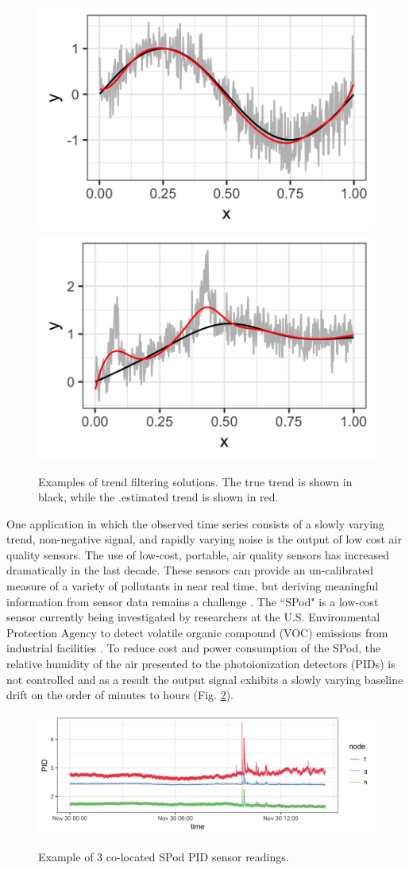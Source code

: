 \documentclass[12pt]{article}
\begin{document}
	\begin{figure}
		\centering
		\caption{Examples of trend filtering solutions. The true trend is shown in black, while the .estimated trend is shown in red.}
		\includegraphics[width = 0.45\linewidth]{Figures/trend_filter_eg1.png}
		\includegraphics[width = 0.45\linewidth]{Figures/trend_filter_eg2.png}
		\label{fig:trendfilter}
	\end{figure}
	 
	
	One application in which the observed time series consists of a slowly varying trend, non-negative signal, and rapidly varying noise is the output of low cost air quality sensors. The use of low-cost, portable, air quality sensors has increased dramatically in the last decade. These sensors can provide an un-calibrated measure of a variety of pollutants in near real time, but deriving meaningful information from sensor data remains a challenge \citep{snyder2013changing}. The ``SPod" is a low-cost sensor currently being investigated by researchers at the U.S. Environmental Protection Agency to detect volatile organic compound (VOC) emissions from industrial facilities \citep{thoma2016south}. To reduce cost and power consumption of the SPod, the relative humidity of the air presented to the photoionization detectors (PIDs) is not controlled and as a result the output signal exhibits a slowly varying baseline drift on the order of minutes to hours (Fig. \ref{fig:raw_spod}). 
	 
	\begin{figure}[b!]
		\caption{Example of 3 co-located SPod PID sensor readings.}
		\includegraphics[width = \linewidth]{Figures/uncorrected_data.png}
		\label{fig:raw_spod}
	\end{figure}
   	
\end{document}
